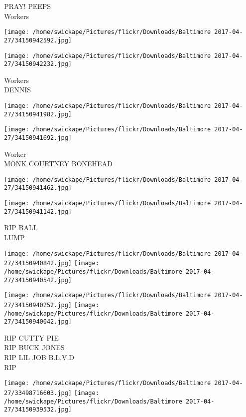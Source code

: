 \documentclass[10pt,letterpaper]{article}
\begin{document}
PRAY!  PEEPS\\
Workers\\
\pagebreak

\texttt{[image: /home/swickape/Pictures/flickr/Downloads/Baltimore 2017-04-27/34150942592.jpg]}

\vspace{0.25in}
\texttt{[image: /home/swickape/Pictures/flickr/Downloads/Baltimore 2017-04-27/34150942232.jpg]}

Workers\\
DENNIS\\
\pagebreak

\texttt{[image: /home/swickape/Pictures/flickr/Downloads/Baltimore 2017-04-27/34150941982.jpg]}

\vspace{0.25in}
\texttt{[image: /home/swickape/Pictures/flickr/Downloads/Baltimore 2017-04-27/34150941692.jpg]}

Worker\\
MONK COURTNEY BONEHEAD\\
\pagebreak

\texttt{[image: /home/swickape/Pictures/flickr/Downloads/Baltimore 2017-04-27/34150941462.jpg]}

\vspace{0.25in}
\texttt{[image: /home/swickape/Pictures/flickr/Downloads/Baltimore 2017-04-27/34150941142.jpg]}

RIP BALL\\
LUMP\\
\pagebreak

\texttt{[image: /home/swickape/Pictures/flickr/Downloads/Baltimore 2017-04-27/34150940842.jpg]}
\texttt{[image: /home/swickape/Pictures/flickr/Downloads/Baltimore 2017-04-27/34150940542.jpg]}

\texttt{[image: /home/swickape/Pictures/flickr/Downloads/Baltimore 2017-04-27/34150940252.jpg]}
\texttt{[image: /home/swickape/Pictures/flickr/Downloads/Baltimore 2017-04-27/34150940042.jpg]}

RIP CUTTY PIE\\
RIP BUCK JONES\\
RIP LIL JOB B.L.V.D\\
RIP\\
\pagebreak

\texttt{[image: /home/swickape/Pictures/flickr/Downloads/Baltimore 2017-04-27/33498716603.jpg]}
\texttt{[image: /home/swickape/Pictures/flickr/Downloads/Baltimore 2017-04-27/34150939532.jpg]}
\end{document}
